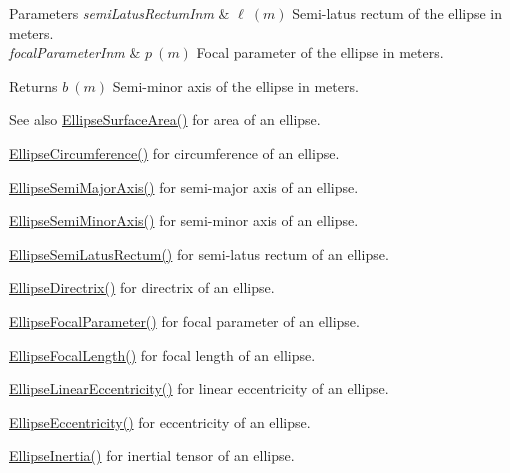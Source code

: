 \begin{DoxyParams}{Parameters}
{\em semi\+Latus\+Rectum\+Inm} & $ \ell\ (m)$ Semi-\/latus rectum of the ellipse in meters. \\
\hline
{\em focal\+Parameter\+Inm} & $ p\ (m)$ Focal parameter of the ellipse in meters. \\
\hline
\end{DoxyParams}
\begin{DoxyReturn}{Returns}
$ b\ (m)$ Semi-\/minor axis of the ellipse in meters. 
\end{DoxyReturn}
\begin{DoxySeeAlso}{See also}
\mbox{\hyperlink{group___e_g_x_math-_geometry-2_d-_ellipse-_surface_area_ga4ce8c8323e9718ce5458f4ab7f6d823d}{Ellipse\+Surface\+Area()}} for area of an ellipse. 

\mbox{\hyperlink{group___e_g_x_math-_geometry-2_d-_ellipse-_circumference_ga4172802ac674eb53467b44928ac635c7}{Ellipse\+Circumference()}} for circumference of an ellipse. 

\mbox{\hyperlink{group___e_g_x_math-_geometry-2_d-_ellipse-_semi_major_axis_ga646a2ca065f4ac3f666a9ea22f3bb527}{Ellipse\+Semi\+Major\+Axis()}} for semi-\/major axis of an ellipse. 

\mbox{\hyperlink{group___e_g_x_math-_geometry-2_d-_ellipse-_semi_minor_axis_gae461acf3333565d69527dd86e9aa2b32}{Ellipse\+Semi\+Minor\+Axis()}} for semi-\/minor axis of an ellipse. 

\mbox{\hyperlink{group___e_g_x_math-_geometry-2_d-_ellipse-_semi_latus_rectum_gacfd1844eb4ef3d1ee3c0b460a6442ae6}{Ellipse\+Semi\+Latus\+Rectum()}} for semi-\/latus rectum of an ellipse. 

\mbox{\hyperlink{group___e_g_x_math-_geometry-2_d-_ellipse-_directrix_gace8f72a8efbc9c18d3eb689151405106}{Ellipse\+Directrix()}} for directrix of an ellipse. 

\mbox{\hyperlink{group___e_g_x_math-_geometry-2_d-_ellipse-_focal_parameter_ga4cd01a38c72c092ef9791351948bf69b}{Ellipse\+Focal\+Parameter()}} for focal parameter of an ellipse. 

\mbox{\hyperlink{group___e_g_x_math-_geometry-2_d-_ellipse-_focal_length_gab8d63de7640c880cfecaeada6f2afdac}{Ellipse\+Focal\+Length()}} for focal length of an ellipse. 

\mbox{\hyperlink{group___e_g_x_math-_geometry-2_d-_ellipse-_linear_eccentricity_gac70b3010e30aa8b73deb50fe2b9b9a91}{Ellipse\+Linear\+Eccentricity()}} for linear eccentricity of an ellipse. 

\mbox{\hyperlink{group___e_g_x_math-_geometry-2_d-_ellipse-_eccentricity_ga6a0a7fba17f782616894cfc447628c33}{Ellipse\+Eccentricity()}} for eccentricity of an ellipse. 

\mbox{\hyperlink{group___e_g_x_math-_geometry-2_d-_ellipse-_inertia_ga10a3049c2f04b50f271fb01dc62e4cf8}{Ellipse\+Inertia()}} for inertial tensor of an ellipse. 
\end{DoxySeeAlso}

